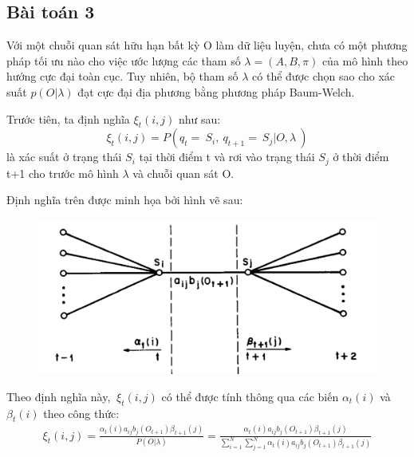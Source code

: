 \documentclass[13pt]{extreport}
\begin{document}
\subsection{\textbf{{Bài toán 3}}}
Với một chuỗi quan sát hữu hạn bất kỳ O làm dữ liệu luyện, chưa có một phương pháp tối ưu nào cho việc ước lượng các tham số $  \lambda = \left( A,B, \pi  \right)  $ của mô hình theo hướng cực đại toàn cục. Tuy nhiên, bộ tham số $  \lambda  $
 có thể được chọn sao cho xác suất $ p \left( O \vert  \lambda  \right)  $  đạt cực đại địa phương bằng phương pháp Baum-Welch.\par
Trước tiên, ta định nghĩa $  \xi _{t} \left( i,j \right)  $ như sau: 
$$ \xi _{t} \left( i,j \right) =P \left( q_{t}=~S_{i},~q_{t+1}=~S_{j} \vert O, \lambda ~ \right) $$
 là xác suất ở trạng thái $S_i$ tại thời điểm t và rơi vào trạng thái $S_j$ ở thời điểm t+1 cho trước mô hình $  \lambda $ và chuỗi quan sát O. \par
Định nghĩa trên được minh họa bởi hình vẽ sau:
\begin{center}
\begin{figure}[H]
\begin{center}
\includegraphics[scale=0.3]{./uploads_new/Hidden_Markov_Model_1._Mo_hinh_Markov_Vi.docx_DIR/media/fig6.PNG}
\end{center}
\end{figure}
\end{center}

Theo định nghĩa này, $ ~ \xi _{t} \left( i,j \right)  $
 có thể được tính thông qua các biến $  \alpha _{t} \left( i \right)  $
 và $  \beta _{t} \left( i \right)  $
 theo công thức:   
 $$\begin{array}{l}
{\xi _t}\left( {i,j} \right) = \frac{{{\alpha _t}\left( i \right){a_{ij}}{b_j}({O_{t + 1}}){\beta _{t + 1}}\left( j \right)}}{{P(O|\lambda )}}
 = \frac{{{\alpha _t}\left( i \right){a_{ij}}{b_j}({O_{t + 1}}){\beta _{t + 1}}\left( j \right)}}{{\mathop \sum \limits_{i = 1}^N \mathop \sum \limits_{j = 1}^N {\alpha _t}(i){a_{ij}}{b_j}({O_{t + 1}}){\beta _{t + 1}}\left( j \right)}}
\end{array}$$ \par
\end{document}
